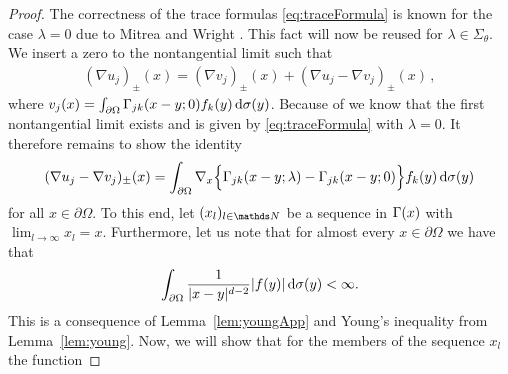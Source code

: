 \begin{proof}
  The correctness of the trace formulas \eqref{eq:traceFormula} is known for the case $\lambda = 0$ due to Mitrea and Wright \cite[Prop.\@~4.4]{mitreaWright}.
  This fact will now be reused for $\lambda \in \Sigma_\theta$.
  We insert a zero to the nontangential limit such that
  \begin{align*}
    (\nabla u_j)_\pm(x) = 
    (\nabla v_j)_\pm(x) + (\nabla u_j - \nabla v_j)_\pm(x)\,,
  \end{align*}
  where $v_j(x) = \int_{\partial\Omega} \Gamma_{jk}(x - y; 0) f_k(y) \, {\operatorname{d}\!{\sigma}}(y)$.
  Because of \cite{mitreaWright} we know that the first nontangential limit exists and is given by \eqref{eq:traceFormula} with $\lambda = 0$.
  It therefore remains to show the identity
  \begin{align*}
    (\nabla u_j - \nabla v_j)_\pm(x) = \int_{\partial\Omega} \nabla_x \Big\{ \Gamma_{jk}(x - y; \lambda) - \Gamma_{jk}(x - y; 0) \Big\} f_k(y) \, {\operatorname{d}\!{\sigma}}(y)
  \end{align*}
  for all $x \in \partial \Omega$.
  To this end, let $(x_l)_{l \in \N}$ be a sequence in $\Gamma(x)$ with $\lim_{l \to \infty} x_l = x$.
  Furthermore, let us note that for almost every $x \in \partial\Omega$ we have that 
  \begin{align*}
    \int_{\partial\Omega} \frac{1}{|x - y|^{d - 2}} |f(y)| \, {\operatorname{d}\!{\sigma}}(y) < \infty.
  \end{align*}
  This is a consequence of Lemma~\ref{lem:youngApp} and Young's inequality from Lemma~\ref{lem:young}.
  Now, we will show that for the members of the sequence $x_l$ the function

\end{proof}
